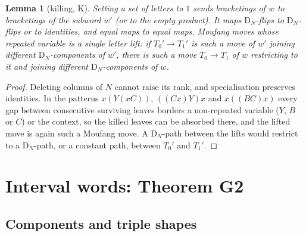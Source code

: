 \documentclass[11pt,a4paper]{article}
\newtheorem{lemma}[thm]{Lemma}
\theoremstyle{definition}
\theoremstyle{remark}
\newcommand{\DN}{\mathrm{D}_N}
\begin{document}
\begin{lemma}[killing, K]\label{lem:K}
Setting a set of letters to $1$ sends bracketings of $w$ to bracketings of the subword $w'$ (or to the
empty product). It maps $\DN$-flips to $\DN$-flips or to identities, and equal maps to equal maps.
Moufang moves whose repeated variable is a single letter \emph{lift}: if $T_0'\to T_1'$ is such a move
of $w'$ joining different $\DN$-components of $w'$, there is such a move $T_0\to T_1$ of $w$ restricting
to it and joining different $\DN$-components of $w$.
\end{lemma}
\begin{proof}
Deleting columns of $N$ cannot raise its rank, and specialisation preserves identities. In the patterns
$x(Y(xC))$, $((Cx)Y)x$ and $x((BC)x)$ every gap between consecutive surviving leaves borders a
non-repeated variable ($Y$, $B$ or $C$) or the context, so the killed leaves can be absorbed there, and
the lifted move is again such a Moufang move. A $\DN$-path between the lifts would restrict to a
$\DN$-path, or a constant path, between $T_0'$ and $T_1'$.
\end{proof}

\section{Interval words: Theorem G2}\label{sec:interval}

\subsection{Components and triple shapes}
\end{document}
